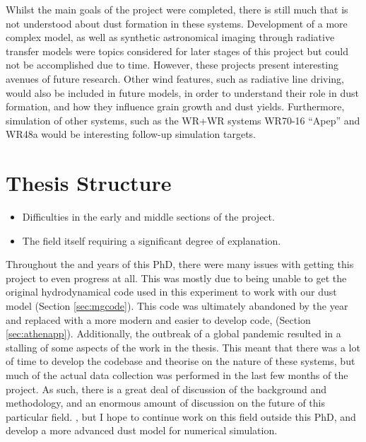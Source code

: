 Whilst the main goals of the project were completed, there is still much that is not understood about dust formation in these systems.
Development of a more complex model, as well as synthetic astronomical imaging through radiative transfer models were topics considered for later stages of this project but could not be accomplished due to time.
However, these projects present interesting avenues of future research.
Other wind features, such as radiative line driving, would also be included in future models, in order to understand their role in dust formation, and how they influence grain growth and dust yields.
Furthermore, simulation of other systems, such as the WR+WR systems WR70-16 ``Apep'' and WR48a would be interesting follow-up simulation targets.

\section{Thesis Structure}


\begin{itemize}
  \item Difficulties in the early and middle sections of the project.
  \item The field itself requiring a significant degree of explanation.
\end{itemize}

\noindent
Throughout the  and  years of this PhD, there were many issues with getting this project to even progress at all.
This was mostly due to being unable to get the original hydrodynamical code used in this experiment to work with our dust model (Section \ref{sec:mgcode}).
This code was ultimately abandoned by the  year and replaced with a more modern and easier to develop code, \athena{} (Section \ref{sec:athenapp}).
Additionally, the outbreak of a global pandemic resulted in a stalling of some aspects of the work in the thesis.
This meant that there was a lot of time to develop the codebase and theorise on the nature of these systems, but much of the actual data collection was performed in the last few months of the project.
As such, there is a great deal of discussion of the background and methodology, and an enormous amount of discussion on the future of this particular field.
, but I hope to continue work on this field outside this PhD, and develop a more advanced dust model for numerical simulation.

